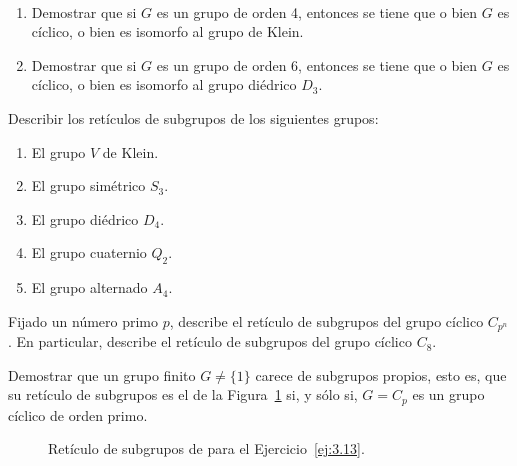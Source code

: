 \begin{ejercicio}\label{ej:3.10}~
    \begin{enumerate}
        \item Demostrar que si $G$ es un grupo de orden 4, entonces se tiene que o bien $G$ es cíclico, o bien es isomorfo al grupo de Klein.
        \item Demostrar que si $G$ es un grupo de orden 6, entonces se tiene que o bien $G$ es cíclico, o bien es isomorfo al grupo diédrico $D_3$.
    \end{enumerate}
\end{ejercicio}

\begin{ejercicio}\label{ej:3.11}
    Describir los retículos de subgrupos de los siguientes grupos:
    \begin{enumerate}
        \item El grupo $V$ de Klein.
        \item El grupo simétrico $S_3$.
        \item El grupo diédrico $D_4$.
        \item El grupo cuaternio $Q_2$.
        \item El grupo alternado $A_4$.
    \end{enumerate}
\end{ejercicio}

\begin{ejercicio}\label{ej:3.12}
    Fijado un número primo $p$, describe el retículo de subgrupos del grupo cíclico $C_{p^n}$. En particular, describe el retículo de subgrupos del grupo cíclico $C_8$.
\end{ejercicio}

\begin{ejercicio}\label{ej:3.13}
    Demostrar que un grupo finito $G \neq \{1\}$ carece de subgrupos propios, esto es, que su retículo de subgrupos es el de la Figura~\ref{fig:ej13} si, y sólo si, $G = C_p$ es un grupo cíclico de orden primo.
    \begin{figure}
        \centering
        \caption{Retículo de subgrupos de para el Ejercicio~\ref{ej:3.13}.}
        \label{fig:ej13}
    \end{figure}
\end{ejercicio}

